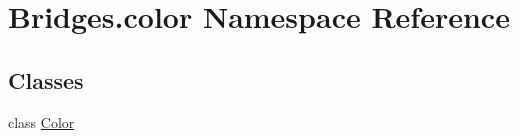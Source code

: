 \hypertarget{namespace_bridges_1_1color}{}\section{Bridges.\+color Namespace Reference}
\label{namespace_bridges_1_1color}
\subsection*{Classes}
\begin{DoxyCompactItemize}
\item 
class \hyperlink{class_bridges_1_1color_1_1_color}{Color}
\end{DoxyCompactItemize}
